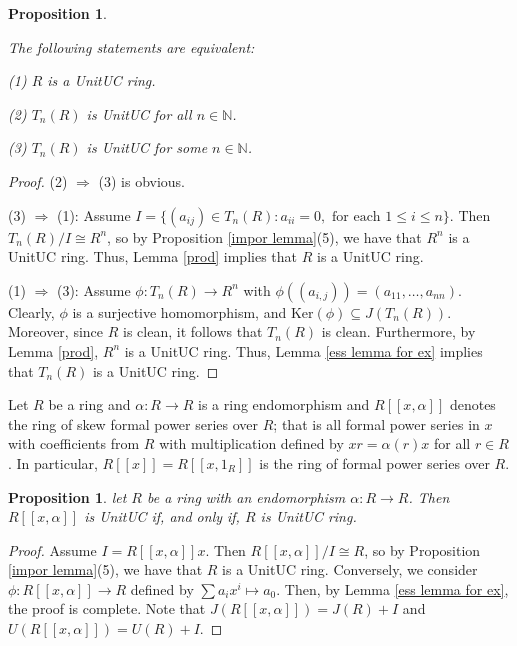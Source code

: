 \documentclass[12pt]{amsart}
\newtheorem{proposition}[theorem]{Proposition}
\theoremstyle{definition}
\begin{document}
\begin{proposition}\label{triangular}

 The following statements are equivalent:

(1) $R$ is a   UnitUC ring.

(2) $T_n(R)$ is   UnitUC for all $n \in \mathbb{N}$.

(3)  $T_n(R)$ is  UnitUC for some $n \in \mathbb{N}$.

\end{proposition}
\begin{proof}
(2) $\Rightarrow $ (3) is obvious.

(3) $\Rightarrow $ (1): Assume $I=\{ (a_{ij}) \in T_n(R) : a_{ii}=0, \text{ for each } 1\leq i \leq n\}$. Then $T_n(R)/I \cong R^n$, so by Proposition \ref{impor lemma}(5), we have that $R^n$ is a   UnitUC ring. Thus, Lemma \ref{prod} implies that $R$ is a   UnitUC  ring.

(1) $\Rightarrow $ (3): Assume $\phi : T_n(R) \longrightarrow R^n$ with $\phi((a_{i,j}))= (a_{11}, \ldots, a_{nn})$. Clearly, $\phi$ is a surjective homomorphism, and $\text{Ker}(\phi) \subseteq J(T_n(R))$. Moreover, since $R$ is clean, it follows that $T_n(R)$ is clean. Furthermore, by Lemma \ref{prod}, $R^n$ is a   UnitUC ring. Thus, Lemma \ref{ess lemma for ex} implies that $T_n(R)$ is a   UnitUC ring.
\end{proof}


Let $R$ be a ring and $\alpha : R \to R$ is a ring endomorphism and $R[[x, \alpha]]$ denotes the ring of skew formal power series over $R$; that is all formal power series in $x$ with coefficients from $R$ with multiplication defined by $xr = \alpha(r)x$ for all $r \in R$. In particular, $R[[x]] = R[[x, 1_R]]$ is the ring of formal power series over $R$.

\begin{proposition}\label{series}
let $R$ be a ring with an endomorphism $\alpha : R \to R$. Then $R[[x, \alpha]]$ is   UnitUC if, and only if, $R$ is   UnitUC  ring.
\end{proposition}
\begin{proof}
    Assume $I=R[[x, \alpha]]x $. Then $R[[x, \alpha]]/I \cong R$, so by Proposition \ref{impor lemma}(5), we have that $R$ is a   UnitUC ring. Conversely, we consider $ \phi: R[[x, \alpha]] \longrightarrow R $ defined by $ \sum a_ix^i \mapsto a_0 $. Then, by Lemma \ref{ess lemma for ex}, the proof is complete. Note that $ J(R[[x, \alpha]]) = J(R) + I $ and $ U(R[[x, \alpha]]) = U(R) + I $.
\end{proof}
\end{document}
